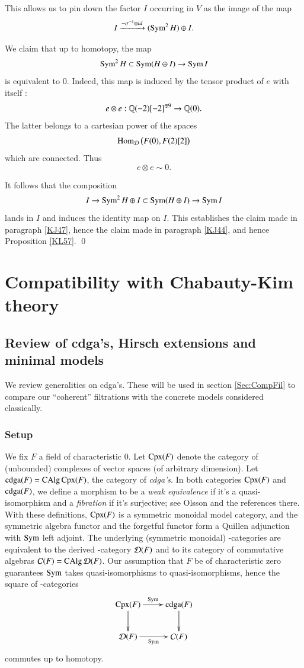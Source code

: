 This allows us to pin down the factor $I$ occurring in $V$ as the image of the map
\[
I \xrightarrow{-\sigma^{-1} \oplus id} (\operatorname{Sym}^2 H) \oplus I.
\]


We claim that up to homotopy, the map
\[
\operatorname{Sym}^2 H \subset \operatorname{Sym}( H \oplus I) \to \operatorname{Sym} I
\]
is equivalent to 0. Indeed, this map is induced by the tensor product of $e$ with itself :
\[
e \otimes e : \mathbb{Q}(-2)[-2]^{\oplus 9} \to \mathbb{Q}(0).
\] 
The latter belongs to a cartesian power of the spaces 
\[
\operatorname{Hom}_{\mathcal{D}}  \big( F(0), F(2)[2] \big)
\]
which are connected. Thus
\[
e \otimes e \sim 0.
\]

It follows that the composition
\[
I \to \operatorname{Sym}^2 H \oplus I  \subset \operatorname{Sym}(H \oplus I) \to \operatorname{Sym} I
\]
lands in $I$ and induces the identity map on $I$. This establishes the claim made in paragraph \ref{KJ47}, hence the claim made in paragraph \ref{KJ44}, and hence Proposition \ref{KL57}. \qed



\section{Compatibility with Chabauty-Kim theory}
\label{Sec:Comp}


\subsection{Review of cdga's, Hirsch extensions and minimal models}
\label{Sec:Anim}
We review generalities on cdga's. These will be used in section \ref{Sec:CompFil} to compare our ``coherent'' filtrations with the concrete models considered classically.

\subsubsection{Setup}
\label{LA22}
We fix $F$ a field of characteristic $0$. Let $\operatorname{Cpx}(F)$ denote the category of (unbounded) complexes of vector spaces (of arbitrary dimension). Let $\operatorname{cdga}(F) = \operatorname{CAlg} \operatorname{Cpx}(F)$, the category of \emph{cdga's}. In both categories $\operatorname{Cpx}(F)$ and $\operatorname{cdga}(F)$, we define a morphism to be a \emph{weak equivalence} if it's a quasi-isomorphism and a \emph{fibration} if it's surjective; see Olsson \cite{OlssonBar} and the references there. With these definitions, $\operatorname{Cpx}(F)$ is a symmetric monoidal model category, and the symmetric algebra functor and the forgetful functor form a Quillen adjunction with $\operatorname{Sym}$ left adjoint. The underlying (symmetric monoidal) \oo-categories are equivalent to the derived \oo-category $\mathcal{D}(F)$ and to its category of commutative algebras $\mathcal{C}(F) = \operatorname{CAlg} \mathcal{D}(F)$. Our assumption that $F$ be of characteristic zero guarantees $\operatorname{Sym}$ takes quasi-isomorphisms to quasi-isomorphisms, hence the square of \oo-categories
\[
\xymatrix{
\Cpx(F) \ar[r]^-{\Sym} \ar[d] & \cdga(F) \ar[d]
\\
\Dd(F) \ar[r]_{\Sym} & \Cc(F)
}
\]
commutes up to homotopy. 


